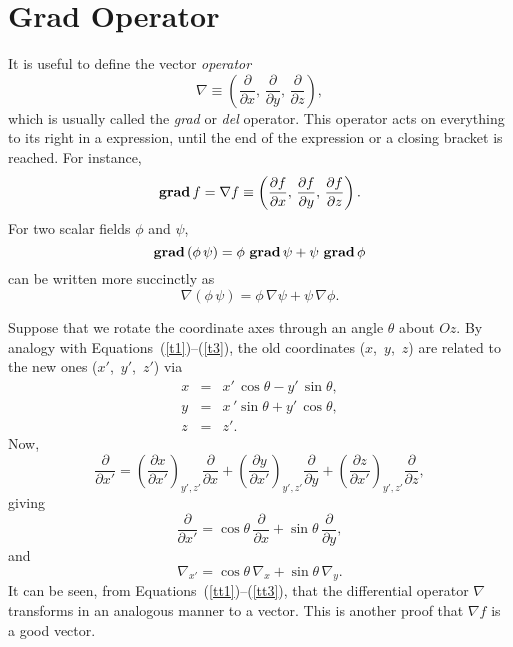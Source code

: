 \section{Grad Operator}\label{sgradx}
It is useful to define the vector {\em operator}
\begin{equation}
\nabla \equiv \left( \frac{\partial}{\partial x},\, \frac{\partial}{\partial y},\,
\frac{\partial }{\partial z}\right),
\end{equation}
which is usually called the {\em grad}\/ or  {\em del}\/ operator. 
This operator acts on everything to
its right in a expression,   until the end of the expression
or a closing bracket is reached.
For instance,
\begin{equation}
{\bf grad}\,f  = \nabla f \equiv \left(\frac{\partial f}{\partial x},\,
\frac{\partial f}{\partial y},\,\frac{\partial f}{\partial z}\right).
\end{equation}
For two scalar fields $\phi$ and $\psi$,
\begin{equation}
{\bf grad}\,(\phi \,\psi) = \phi\,\, {\bf grad}\,\psi +\psi\,\, {\bf grad}\,\phi
\end{equation}
can be written more succinctly as
\begin{equation}
\nabla(\phi\, \psi) = \phi \,\nabla\psi + \psi\, \nabla \phi.
\end{equation}

Suppose that we rotate the coordinate axes through an angle $\theta$  about $Oz$. 
By analogy with Equations~(\ref{t1})--(\ref{t3}), the old coordinates ($x$,\, $y$, \,$z$) are related 
to the new ones ($x'$, \,$y'$,\, $z'$) via
\begin{eqnarray}
x &=& x'\, \cos\theta - y'\,\sin\theta,\\[0.5ex]
y &=& x\,'\sin\theta +y'\,\cos\theta,\\[0.5ex]
z&=& z'.
\end{eqnarray}
Now,
\begin{equation}
\frac{\partial}{\partial x'} = \left(\frac{\partial x}{\partial x'} \right)_{y',z'}
\frac{\partial}{\partial x}+\left(\frac{\partial y}{\partial x'} \right)_{y',z'}
\frac{\partial}{\partial y}+\left(\frac{\partial z}{\partial x'} \right)_{y',z'}
\frac{\partial}{\partial z},
\end{equation}
giving
\begin{equation}
\frac{\partial}{\partial x'} = \cos\theta \,\frac{\partial}{\partial x} + 
\sin\theta \,\frac{\partial}{\partial y},
\end{equation}
and 
\begin{equation}
\nabla_{x'} = \cos\theta\, \nabla_x + \sin\theta \,\nabla_y.
\end{equation}
It can be seen, from  Equations~(\ref{tt1})--(\ref{tt3}), that 
the differential operator $\nabla$ transforms in an analogous manner to
a vector.
 This is another proof that $\nabla f$ is a good  vector.


